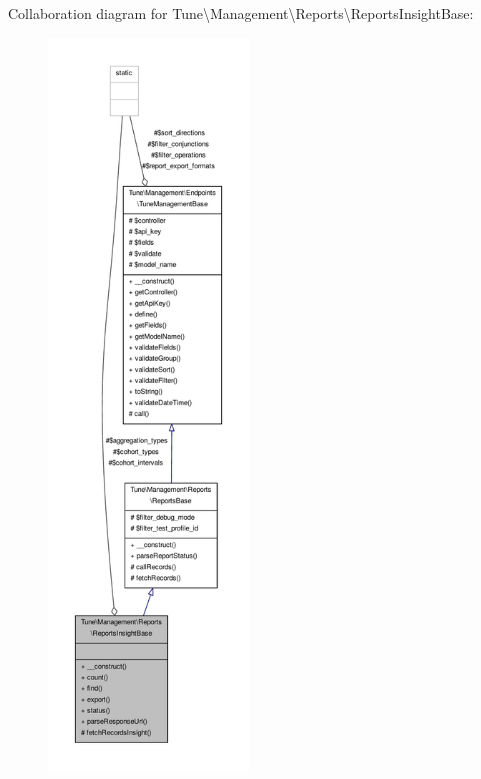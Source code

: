 Collaboration diagram for Tune\textbackslash{}Management\textbackslash{}Reports\textbackslash{}Reports\-Insight\-Base\-:
\nopagebreak
\begin{figure}[H]
\begin{center}
\leavevmode
\includegraphics[height=550pt]{classTune_1_1Management_1_1Reports_1_1ReportsInsightBase__coll__graph}
\end{center}
\end{figure}
